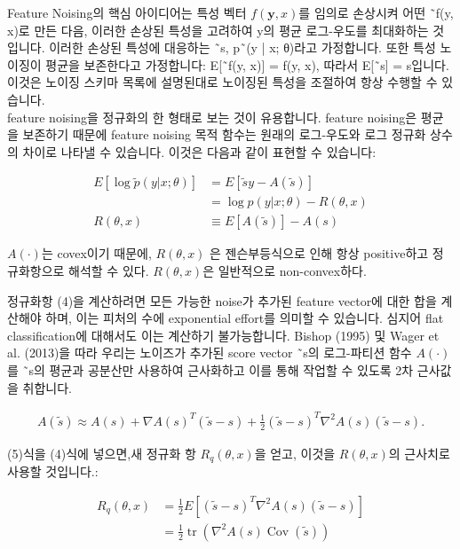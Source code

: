 \documentclass{article}
\begin{document}
Feature Noising의 핵심 아이디어는 특성 벡터 $f(\textbf{y}, x)$를 임의로 손상시켜 어떤 ˜f(y, x)로 만든 다음, 이러한 손상된 특성을 고려하여 y의 평균 로그-우도를 최대화하는 것입니다. 이러한 손상된 특성에 대응하는 ˜s, p˜(y | x; θ)라고 가정합니다. 또한 특성 노이징이 평균을 보존한다고 가정합니다: E[˜f(y, x)] = f(y, x), 따라서 E[˜s] = s입니다. 이것은 노이징 스키마 목록에 설명된대로 노이징된 특성을 조절하여 항상 수행할 수 있습니다.\\

feature noising을 정규화의 한 형태로 보는 것이 유용합니다. feature noising은 평균을 보존하기 때문에 feature noising 목적 함수는 원래의 로그-우도와 로그 정규화 상수의 차이로 나타낼 수 있습니다. 이것은 다음과 같이 표현할 수 있습니다:


\begin{align}
    E[\log \tilde{p}(y | x; \theta)] &= E[\tilde{s}y - A(\tilde{s})] \\
    &= \log p(y | x; \theta) - R(\theta, x) \\
    R(\theta, x) &\equiv E[A(\tilde{s})] - A(s)
\end{align}


$A(\cdot)$는 covex이기 때문에, $R(\theta, x)$ 은 젠슨부등식으로 인해 항상 positive하고 
정규화항으로 해석할 수 있다. $R(\theta, x)$은 일반적으로 non-convex하다.

정규화항 (4)을 계산하려면 모든 가능한 noise가 추가된 feature vector에 대한 합을 계산해야 하며, 이는 피처의 수에 exponential effort를 의미할 수 있습니다. 심지어 flat classification에 대해서도 이는 계산하기 불가능합니다. Bishop (1995) 및 Wager et al. (2013)을 따라 우리는 노이즈가 추가된 score vector ˜s의 로그-파티션 함수 $A(\cdot)$를 ˜s의 평균과 공분산만 사용하여 근사화하고 이를 통해 작업할 수 있도록 2차 근사값을 취합니다.

\begin{align}
    A(\tilde{s}) \approx A(s) + \nabla A(s)^T(\tilde{s} - s) + \frac{1}{2}(\tilde{s} - s)^T \nabla^2 A(s)(\tilde{s} - s).
\end{align}

(5)식을 (4)식에 넣으면,새 정규화 항 $R_q(\theta, x)$을 얻고, 이것을 $R(\theta, x)$의 근사치로 사용할 것입니다.:

\begin{align}
R_q(\theta, x) &= \frac{1}{2} E[(\tilde{s} - s)^T \nabla^2 A(s)(\tilde{s} - s)] \\
&= \frac{1}{2} \operatorname{tr}(\nabla^2 A(s) \operatorname{Cov}(\tilde{s}))
\end{align}
\end{document}
